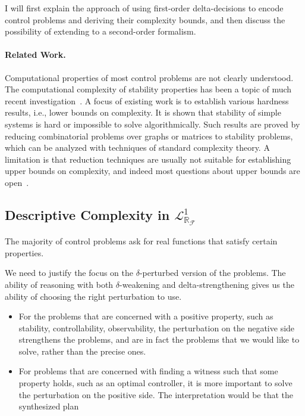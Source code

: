 \documentclass[11pt]{article}
\newcommand{\lrf}{\mathcal{L}_{\mathbb{R}_{\mathcal{F}}}}
\theoremstyle{definition}
\begin{document}
I will first explain the approach of using first-order delta-decisions to encode control problems and deriving their complexity bounds, and then discuss the possibility of extending to a second-order formalism. 

\paragraph{Related Work.} Computational properties of most control problems are not clearly understood. The computational complexity of stability properties has been a topic of much recent investigation~\cite{DBLP:journals/corr/AhmadiP13,DBLP:journals/automatica/BlondelT99,DBLP:journals/automatica/BlondelT00,AAAthesis,DBLP:conf/hybrid/PrabhakarV13,DBLP:journals/corr/abs-1210-7420}. A focus of existing work is to establish various hardness results, i.e., lower bounds on complexity. It is shown that stability of simple systems is hard or impossible to solve algorithmically. Such results are proved by reducing combinatorial problems over graphs or matrices to stability problems, which can be analyzed with techniques of standard complexity theory. A limitation is that reduction techniques are usually not suitable for establishing upper bounds on complexity, and indeed most questions about upper bounds are open~\cite{AAAthesis}. 

\subsection{Descriptive Complexity in $\lrf^1$} 

The majority of control problems ask for real functions that satisfy certain properties. 

We need to justify the focus on the $\delta$-perturbed version of the problems. The ability of reasoning with both $\delta$-weakening and delta-strengthening gives us the ability of choosing the right perturbation to use. 
\begin{itemize}
\item For the problems that are concerned with a positive property, such as stability, controllability, observability, the perturbation on the negative side strengthens the problems, and are in fact the problems that we would like to solve, rather than the precise ones. 
\item For problems that are concerned with finding a witness such that some property holds, such as an optimal controller, it is more important to solve the perturbation on the positive side. The interpretation would be that the synthesized plan 
\end{itemize}
\end{document}
